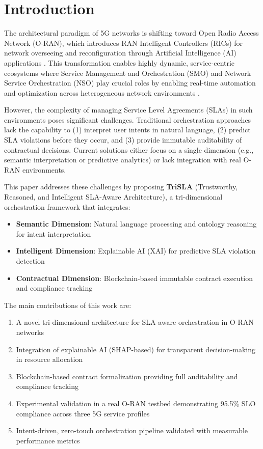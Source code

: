 \documentclass[review]{elsarticle}
\begin{document}
\section{Introduction}

The architectural paradigm of 5G networks is shifting toward Open Radio Access Network (O-RAN), which introduces RAN Intelligent Controllers (RICs) for network overseeing and reconfiguration through Artificial Intelligence (AI) applications \cite{oran2023,oran-survey-2023}. This transformation enables highly dynamic, service-centric ecosystems where Service Management and Orchestration (SMO) and Network Service Orchestration (NSO) play crucial roles by enabling real-time automation and optimization across heterogeneous network environments \cite{sdn-survey-2023}.

However, the complexity of managing Service Level Agreements (SLAs) in such environments poses significant challenges. Traditional orchestration approaches lack the capability to (1) interpret user intents in natural language, (2) predict SLA violations before they occur, and (3) provide immutable auditability of contractual decisions. Current solutions either focus on a single dimension (e.g., semantic interpretation or predictive analytics) or lack integration with real O-RAN environments.

This paper addresses these challenges by proposing \textbf{TriSLA} (Trustworthy, Reasoned, and Intelligent SLA-Aware Architecture), a tri-dimensional orchestration framework that integrates:
\begin{itemize}
    \item \textbf{Semantic Dimension}: Natural language processing and ontology reasoning for intent interpretation
    \item \textbf{Intelligent Dimension}: Explainable AI (XAI) for predictive SLA violation detection
    \item \textbf{Contractual Dimension}: Blockchain-based immutable contract execution and compliance tracking
\end{itemize}

The main contributions of this work are:
\begin{enumerate}
    \item A novel tri-dimensional architecture for SLA-aware orchestration in O-RAN networks
    \item Integration of explainable AI (SHAP-based) for transparent decision-making in resource allocation
    \item Blockchain-based contract formalization providing full auditability and compliance tracking
    \item Experimental validation in a real O-RAN testbed demonstrating 95.5\% SLO compliance across three 5G service profiles
    \item Intent-driven, zero-touch orchestration pipeline validated with measurable performance metrics
\end{enumerate}
\end{document}
